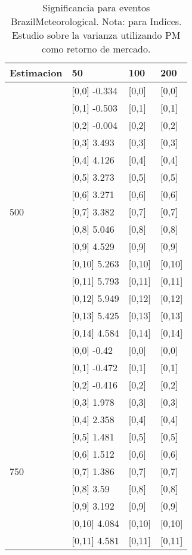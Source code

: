 \begin{table}

\caption{Significancia para eventos BrazilMeteorological. Nota: para Indices. Estudio sobre la varianza utilizando PM como retorno de mercado.}
\centering
\begin{tabular}[t]{llll}
\toprule
Estimacion & 50 & 100 & 200\\
\midrule
 & {}[0,0] -0.334 & {}[0,0] & {}[0,0]\\
 & {}[0,1] -0.503 & {}[0,1] & {}[0,1]\\
 & {}[0,2] -0.004 & {}[0,2] & {}[0,2]\\
 & {}[0,3] 3.493 & {}[0,3] & {}[0,3]\\
 & {}[0,4] 4.126 & {}[0,4] & {}[0,4]\\
\addlinespace
 & {}[0,5] 3.273 & {}[0,5] & {}[0,5]\\
 & {}[0,6] 3.271 & {}[0,6] & {}[0,6]\\
500 & {}[0,7] 3.382 & {}[0,7] & {}[0,7]\\
 & {}[0,8] 5.046 & {}[0,8] & {}[0,8]\\
 & {}[0,9] 4.529 & {}[0,9] & {}[0,9]\\
\addlinespace
 & {}[0,10] 5.263 & {}[0,10] & {}[0,10]\\
 & {}[0,11] 5.793 & {}[0,11] & {}[0,11]\\
 & {}[0,12] 5.949 & {}[0,12] & {}[0,12]\\
 & {}[0,13] 5.425 & {}[0,13] & {}[0,13]\\
 & {}[0,14] 4.584 & {}[0,14] & {}[0,14]\\
\addlinespace
 & {}[0,0] -0.42 & {}[0,0] & {}[0,0]\\
 & {}[0,1] -0.472 & {}[0,1] & {}[0,1]\\
 & {}[0,2] -0.416 & {}[0,2] & {}[0,2]\\
 & {}[0,3] 1.978 & {}[0,3] & {}[0,3]\\
 & {}[0,4] 2.358 & {}[0,4] & {}[0,4]\\
\addlinespace
 & {}[0,5] 1.481 & {}[0,5] & {}[0,5]\\
 & {}[0,6] 1.512 & {}[0,6] & {}[0,6]\\
750 & {}[0,7] 1.386 & {}[0,7] & {}[0,7]\\
 & {}[0,8] 3.59 & {}[0,8] & {}[0,8]\\
 & {}[0,9] 3.192 & {}[0,9] & {}[0,9]\\
\addlinespace
 & {}[0,10] 4.084 & {}[0,10] & {}[0,10]\\
 & {}[0,11] 4.581 & {}[0,11] & {}[0,11]\\

\end{tabular}
\end{table}

